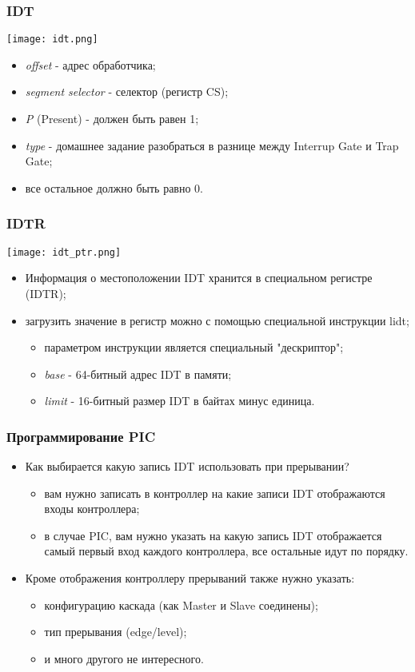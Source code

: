 \begin{frame}
\frametitle{IDT}
\begin{center}
  \texttt{[image: idt.png]}
\end{center}
\begin{itemize}
  \item \emph{offset} - адрес обработчика;
  \item \emph{segment selector} - селектор (регистр CS);
  \item \emph{P} (Present) - должен быть равен 1;
  \item \emph{type} - домашнее задание разобраться в разнице между Interrup
  Gate и Trap Gate;
  \item все остальное должно быть равно 0.
\end{itemize}
\end{frame}

\begin{frame}
\frametitle{IDTR}
\begin{center}
  \texttt{[image: idt\_ptr.png]}
\end{center}
\begin{itemize}
  \item Информация о местоположении IDT хранится в специальном регистре (IDTR);
  \item загрузить значение в регистр можно с помощью специальной инструкции
  lidt;
  \begin{itemize}
    \item параметром инструкции является специальный "дескриптор";
    \item \emph{base} - 64-битный адрес IDT в памяти;
    \item \emph{limit} - 16-битный размер IDT в байтах минус единица.
  \end{itemize}
\end{itemize}
\end{frame}

\begin{frame}
\frametitle{Программирование PIC}
\begin{itemize}
  \item Как выбирается какую запись IDT использовать при прерывании?
  \begin{itemize}
    \item вам нужно записать в контроллер на какие записи IDT отображаются
    входы контроллера;
    \item в случае PIC, вам нужно указать на какую запись IDT отображается
    самый первый вход каждого контроллера, все остальные идут по порядку.
  \end{itemize}
  \item Кроме отображения контроллеру прерываний также нужно указать:
  \begin{itemize}
    \item конфигурацию каскада (как Master и Slave соединены);
    \item тип прерывания (edge/level);
    \item и много другого не интересного.
  \end{itemize}
\end{itemize}
\end{frame}

